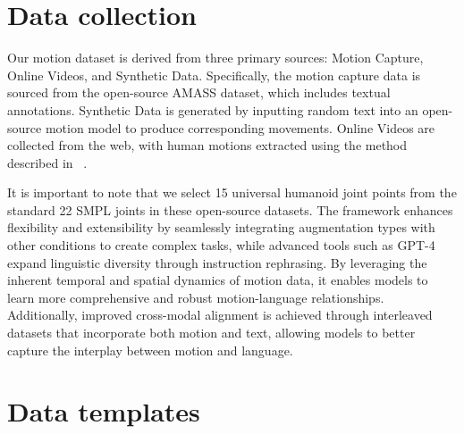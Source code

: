 \newpage
\appendix
\onecolumn

\section{Data collection}

Our motion dataset is derived from three primary sources: Motion Capture, Online Videos, and Synthetic Data. Specifically, the motion capture data is sourced from the open-source AMASS dataset, which includes textual annotations. Synthetic Data is generated by inputting random text into an open-source motion model to produce corresponding movements. Online Videos are collected from the web, with human motions extracted using the method described in ~\cite{wang2025tram}.

It is important to note that we select 15 universal humanoid joint points from the standard 22 SMPL joints in these open-source datasets. The framework enhances flexibility and extensibility by seamlessly integrating augmentation types with other conditions to create complex tasks, while advanced tools such as GPT-4 expand linguistic diversity through instruction rephrasing. By leveraging the inherent temporal and spatial dynamics of motion data, it enables models to learn more comprehensive and robust motion-language relationships. Additionally, improved cross-modal alignment is achieved through interleaved datasets that incorporate both motion and text, allowing models to better capture the interplay between motion and language.



\section{Data templates}

